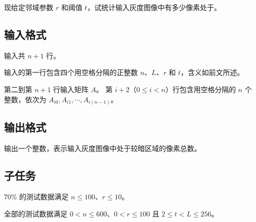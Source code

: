 现给定邻域参数 $r$ 和阈值 $t$，试统计输入灰度图像中有多少像素处于{}。


\subsection*{输入格式}

输入共 $n + 1$ 行。

输入的第一行包含四个用空格分隔的正整数 $n$、$L$、$r$ 和 $t$，含义如前文所述。

第二到第 $n + 1$ 行输入矩阵 $A$。
第 $i + 2$（$0 \le i < n$）行包含用空格分隔的 $n$ 个整数，依次为 $A_{i0}, A_{i1}, \cdots, A_{i(n-1)}$。


\subsection*{输出格式}

输出一个整数，表示输入灰度图像中处于较暗区域的像素总数。

\examplebox{}{}

\examplebox{}{}

\subsection*{子任务}

$70\%$ 的测试数据满足 $n \le 100$、$r \le 10$。

全部的测试数据满足 $0 < n \le 600$、$0 < r \le 100$ 且 $2 \le t < L \le 256$。
